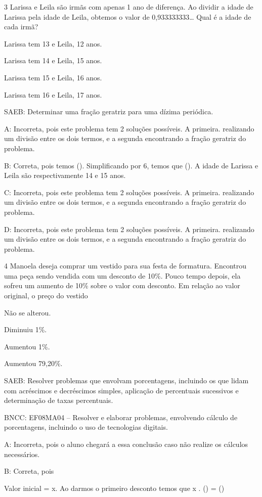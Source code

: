 {\num{3} Larissa e Leila são irmãs com apenas 1 ano de diferença. Ao dividir a
idade de Larissa pela idade de Leila, obtemos o valor de
0,933333333\ldots{} Qual é a idade de cada irmã?
\item Larissa tem 13 e Leila, 12 anos.
\item Larissa tem 14 e Leila, 15 anos.
\item Larissa tem 15 e Leila, 16 anos.
\item Larissa tem 16 e Leila, 17 anos.

SAEB: Determinar uma fração geratriz para uma dízima periódica.

A: Incorreta, pois este problema tem 2 soluções possíveis. A primeira.
realizando um divisão entre os dois termos, e a segunda encontrando a
fração geratriz do problema.

B: Correta, pois temos (). Simplificando por 6, temos que
(). A idade de Larissa e Leila são respectivamente 14 e
15 anos.

C: Incorreta, pois este problema tem 2 soluções possíveis. A primeira.
realizando um divisão entre os dois termos, e a segunda encontrando a
fração geratriz do problema.

D: Incorreta, pois este problema tem 2 soluções possíveis. A primeira.
realizando um divisão entre os dois termos, e a segunda encontrando a
fração geratriz do problema.

\num{4} Manoela deseja comprar um vestido para sua festa de formatura.
Encontrou uma peça sendo vendida com um desconto de 10\%. Pouco tempo
depois, ela sofreu um aumento de 10\% sobre o valor com desconto. Em
relação ao valor original, o preço do vestido
\item Não se alterou.
\item Diminuiu 1\%.
\item Aumentou 1\%.
\item Aumentou 79,20\%.

SAEB: Resolver problemas que envolvam porcentagens, incluindo os que
lidam com acréscimos e decréscimos simples, aplicação de percentuais
sucessivos e determinação de taxas percentuais.

BNCC: EF08MA04 -- Resolver e elaborar problemas, envolvendo cálculo de
porcentagens, incluindo o uso de tecnologias digitais.

A: Incorreta, pois o aluno chegará a essa conclusão caso não realize os
cálculos necessários.

B: Correta, pois

Valor inicial = x. Ao darmos o primeiro desconto temos que x .
() = ()

}
